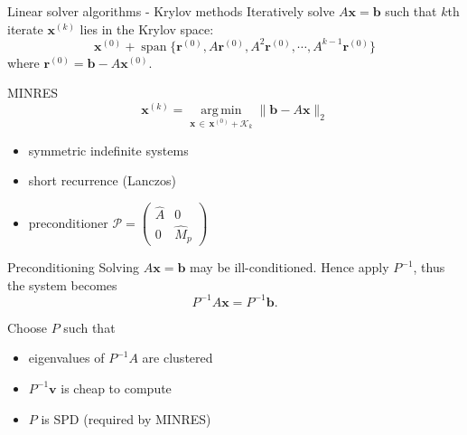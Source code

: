 \documentclass[aspectratio=169]{beamer}
\begin{document}
\begin{frame}{\Large Linear solver algorithms - Krylov methods}
  \Large
  Iteratively solve $A \mathbf{x} = \mathbf{b}$ such that $k$th iterate
  $\mathbf{x}^{(k)}$ lies in the Krylov space:
  \begin{equation*}
    \mathbf{x}^{(0)} + \operatorname{span} \{\mathbf{r}^{(0)}, A\mathbf{r}^{(0)}, A^2\mathbf{r}^{(0)}, \cdots, A^{k-1}\mathbf{r}^{(0)}\}
  \end{equation*}
  where $\mathbf{r}^{(0)} = \mathbf{b} - A \mathbf{x}^{(0)}$.
\end{frame}

\begin{frame}{\Large MINRES}
  \Large
\[
  \mathbf{x}^{(k)} = \operatorname*{arg\,min}_{\mathbf{x}\,\in\,\mathbf{x}^{(0)}+\mathcal{K}_k}
  \|\mathbf{b} - A\mathbf{x}\|_2
\]

\vspace{1em}
\begin{itemize}
  \item symmetric indefinite systems
  \item short recurrence (Lanczos)
  \item preconditioner
    $\mathcal{P} = \begin{pmatrix} \hat A & 0 \\ 0 & \hat M_p \end{pmatrix}$
\end{itemize}
\end{frame}

\begin{frame}{\Large Preconditioning}
  \Large
Solving $A\mathbf{x} = \mathbf{b}$ may be ill-conditioned.
Hence apply $P^{-1}$, thus the system becomes
\[
  P^{-1}A\mathbf{x} = P^{-1}\mathbf{b}.
\]

Choose $P$ such that
\begin{itemize}
  \item eigenvalues of $P^{-1}A$ are clustered
  \item $P^{-1}\mathbf{v}$ is cheap to compute
  \item $P$ is SPD \hfill {\small (required by MINRES)}
\end{itemize}
\end{frame}
\end{document}
